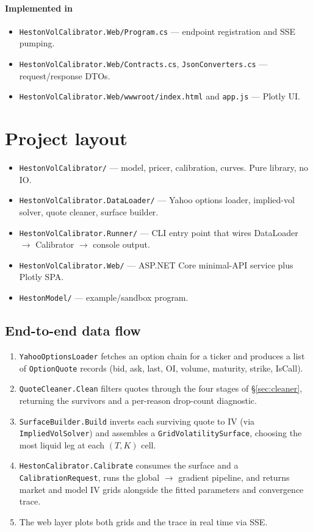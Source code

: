 \documentclass[11pt,a4paper]{article}
\begin{document}
\paragraph*{Implemented in}
\begin{itemize}
\item \texttt{HestonVolCalibrator.Web/Program.cs} --- endpoint registration and SSE pumping.
\item \texttt{HestonVolCalibrator.Web/Contracts.cs}, \texttt{JsonConverters.cs} --- request/response DTOs.
\item \texttt{HestonVolCalibrator.Web/wwwroot/index.html} and \texttt{app.js} --- Plotly UI.
\end{itemize}

\section{Project layout}
\begin{itemize}
\item \texttt{HestonVolCalibrator/} --- model, pricer, calibration, curves. Pure library, no IO.
\item \texttt{HestonVolCalibrator.DataLoader/} --- Yahoo options loader, implied-vol solver, quote cleaner, surface builder.
\item \texttt{HestonVolCalibrator.Runner/} --- CLI entry point that wires DataLoader $\to$ Calibrator $\to$ console output.
\item \texttt{HestonVolCalibrator.Web/} --- ASP.NET Core minimal-API service plus Plotly SPA.
\item \texttt{HestonModel/} --- example/sandbox program.
\end{itemize}

\subsection*{End-to-end data flow}
\begin{enumerate}
\item \texttt{YahooOptionsLoader} fetches an option chain for a ticker and produces a list of \texttt{OptionQuote} records (bid, ask, last, OI, volume, maturity, strike, IsCall).
\item \texttt{QuoteCleaner.Clean} filters quotes through the four stages of \S\ref{sec:cleaner}, returning the survivors and a per-reason drop-count diagnostic.
\item \texttt{SurfaceBuilder.Build} inverts each surviving quote to IV (via \texttt{ImpliedVolSolver}) and assembles a \texttt{GridVolatilitySurface}, choosing the most liquid leg at each $(T, K)$ cell.
\item \texttt{HestonCalibrator.Calibrate} consumes the surface and a \texttt{CalibrationRequest}, runs the global $\to$ gradient pipeline, and returns market and model IV grids alongside the fitted parameters and convergence trace.
\item The web layer plots both grids and the trace in real time via SSE.
\end{enumerate}
\end{document}
